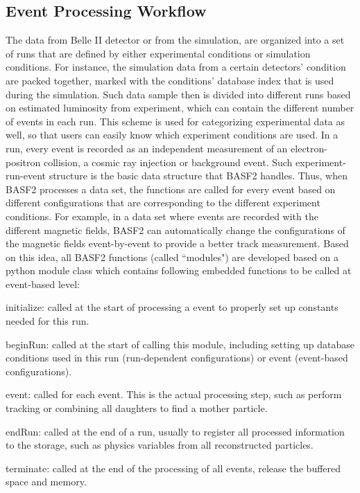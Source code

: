 \subsection{Event Processing Workflow}
The data from Belle II detector or from the simulation, are organized into a set of runs that are defined by either experimental conditions or simulation conditions. For instance, the simulation data from a certain detectors' condition are packed together, marked with the conditions' database index that is used during the simulation.  Such data sample then is divided into different runs based on estimated luminosity from experiment, which can contain the different number of events in each run.  This scheme is used for categorizing experimental data as well, so that users can easily know which experiment conditions are used. 
 In a run, every event is recorded as an independent measurement of  an electron-positron collision, a cosmic ray injection or background event. Such experiment-run-event structure is the basic data structure that BASF2 handles. Thus, when BASF2 processes a data set, the functions are called for every event based on different configurations that are corresponding to the different experiment conditions. For example, in a data set where events are recorded with the different magnetic fields, BASF2 can automatically change the configurations of the magnetic fields event-by-event to provide a better track measurement. Based on this idea, all BASF2 functions (called ``modules") are developed based on a python module class which contains following embedded functions to be called at event-based level: 


\textbullet \space initialize: called at the start of processing a event to properly set up constants needed for this run.

\textbullet \space beginRun: called at the start of calling this module, including setting up database conditions used in this run (run-dependent configurations) or event (event-based configurations).

\textbullet \space event: called for each event. This is the actual processing step, such as perform tracking or combining all daughters to find a mother particle. 

\textbullet \space endRun: called at the end of a run, usually to register all processed information to the storage, such as physics variables from all reconstructed particles.

\textbullet \space terminate: called at the end of the processing of all events, release the buffered space and memory.

